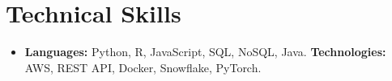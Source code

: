 \documentclass[letterpaper,10pt]{article}
\newcommand{\resumeSubHeadingListStart}{\begin{itemize}[leftmargin=*]}
\newcommand{\resumeSubHeadingListEnd}{\end{itemize}}
\begin{document}
\section{Technical Skills}
	\resumeSubHeadingListStart
	\item{
		\textbf{Languages: }{Python, R, JavaScript, SQL, NoSQL, Java.}
		\hfill
		\textbf{Technologies: }{AWS, REST API, Docker, Snowflake, PyTorch.}
	}
	\resumeSubHeadingListEnd

\end{document}
